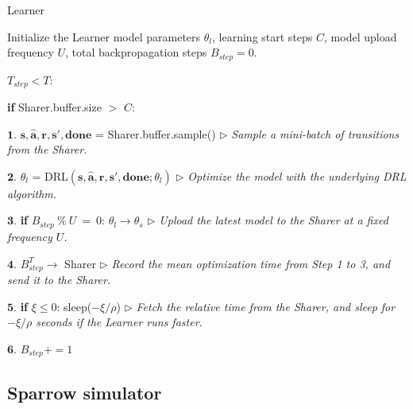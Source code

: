 \documentclass[journal]{IEEEtran}
\begin{document}
\begin{algorithm}[!t]
	\caption{Learner}
	\begin{algorithmic}
		\STATE Initialize the Learner model parameters $\theta_{l}$, learning start steps $C$, model upload frequency $U$, total backpropagation steps $B_{step}=0$.
		
		 $T_{step}<T$:
		
		\STATE \hspace{0.5cm} {\textbf{if}} Sharer.buffer.size $>$ $C$:
		
		\STATE \hspace{1cm} $\textbf{1.}$ $ \textbf{s}, \hat{\textbf{a}}, \textbf{r}, \textbf{s}', \textbf{done}$ = Sharer.buffer.sample() \hspace{0.2cm} $\rhd$ \textit{Sample a mini-batch of transitions from the Sharer. }
		
		\STATE \hspace{0.95cm} $\textbf{2.}$ $\theta_{l} $ = DRL$(\textbf{s}, \hat{\textbf{a}}, \textbf{r}, \textbf{s}', \textbf{done}; \theta_{l})$ \hspace{0.2cm} $\rhd$ \textit{Optimize the model with the underlying DRL algorithm. }
		
		\STATE \hspace{1cm} $\textbf{3.}$ \textbf{if} $B_{step}\ \%\ U$\ =\ 0: $\theta_{l} \rightarrow \theta_{s}$ \hspace{0.2cm} $\rhd$ \textit{Upload the latest model to the Sharer at a fixed frequency $U$. }
		
		\STATE \hspace{0.95cm} $\textbf{4.}$ $B_{step}^{T} \rightarrow$ Sharer \hspace{0.2cm} $\rhd$ \textit{Record the mean optimization time from Step 1 to 3, and send it to the Sharer.}
		
		\STATE \hspace{0.98cm} $\textbf{5.}$ \textbf{if}  $\xi\leq 0$: sleep($ -\xi/{\rho} $) \hspace{0.2cm} $\rhd$ \textit{Fetch the relative time from the Sharer, and sleep for $ -\xi/{\rho} $ seconds if the Learner runs faster.}		
		
		\STATE \hspace{0.94cm} $\textbf{6.}$ $B_{step}+=1$
		
	\end{algorithmic}
\end{algorithm}


\subsection{Sparrow simulator}
\end{document}
